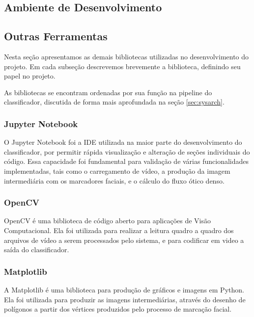 \subsection{Ambiente de Desenvolvimento}
\label{subsec:environ}



\subsection{Outras Ferramentas}
\label{subsec:otools}

Nesta seção apresentamos as demais bibliotecas utilizadas no desenvolvimento do projeto. Em cada subseção descrevemos brevemente a biblioteca, definindo seu papel no projeto.

As bibliotecas se encontram ordenadas por sua função na pipeline do classificador, discutida de forma mais aprofundada na seção \ref{sec:sysarch}.

\subsubsection{Jupyter Notebook}

O Jupyter Notebook \cite{Kluyver:2016aa} foi a IDE utilizada na maior parte do desenvolvimento do classificador, por permitir rápida visualização e alteração de seções individuais do código. Essa capacidade foi fundamental para validação de várias funcionalidades implementadas, tais como o carregamento de vídeo, a produção da imagem intermediária com os marcadores faciais, e o cálculo do fluxo ótico denso.

\subsubsection{OpenCV}

OpenCV \cite{opencv_library} é uma biblioteca de código aberto para aplicações de Visão Computacional. Ela foi utilizada para realizar a leitura quadro a quadro dos arquivos de vídeo a serem processados pelo sistema, e para codificar em video a saída do classificador.

\subsubsection{Matplotlib}

A Matplotlib \cite{Hunter:2007} é uma biblioteca para produção de gráficos e imagens em Python. Ela foi utilizada para produzir as imagens intermediárias, através do desenho de polígonos a partir dos vértices produzidos pelo processo de marcação facial.

